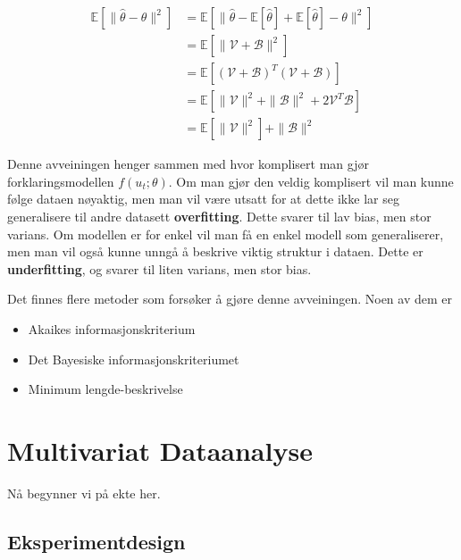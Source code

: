 \documentclass[12pt]{article}
\begin{document}
\begin{align}
\mathbb{E}\left[\|\hat{\theta}-\theta\|^{2}\right] &=\mathbb{E}\left[\|\widehat{\theta}-\mathbb{E}[\widehat{\theta}]+\mathbb{E}[\widehat{\theta}]-\theta\|^{2}\right] \\ \nonumber
&=\mathbb{E}\left[\|\mathcal{V}+\mathcal{B}\|^{2}\right]\\ \nonumber
&=\mathbb{E}\left[(\mathcal{V}+\mathcal{B})^{T}(\mathcal{V}+\mathcal{B})\right] \\ \nonumber
&=\mathbb{E}\left[\|\mathcal{V}\|^{2}+\|\mathcal{B}\|^{2}+2 \mathcal{V}^{T} \mathcal{B}\right] \\ \nonumber
&=\mathbb{E}\left[\|\mathcal{V}\|^{2}\right]+\|\mathcal{B}\|^{2}
\end{align}

Denne avveiningen henger sammen med hvor komplisert man gjør forklaringsmodellen $f(u_t; \theta)$. Om man gjør den veldig komplisert vil man kunne følge dataen nøyaktig, men man vil være utsatt for at dette ikke lar seg generalisere til andre datasett \textbf{overfitting}. Dette svarer til lav bias, men stor varians. Om modellen er for enkel vil man få en enkel modell som generaliserer, men man vil også kunne unngå å beskrive viktig struktur i dataen. Dette er \textbf{underfitting}, og svarer til liten varians, men stor bias.

Det finnes flere metoder som forsøker å gjøre denne avveiningen. Noen av dem er
\begin{itemize}
\item Akaikes informasjonskriterium
\item Det Bayesiske informasjonskriteriumet
\item Minimum lengde-beskrivelse
\end{itemize}


\newpage
\section{Multivariat Dataanalyse}
Nå begynner vi på ekte her.

\subsection{Eksperimentdesign}
\end{document}
